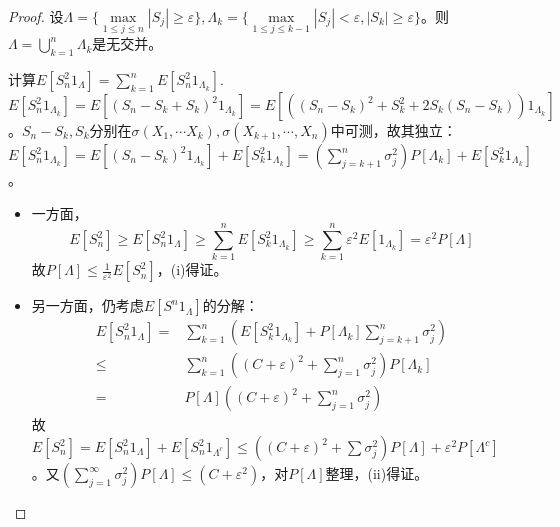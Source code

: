 \documentclass{ctexbook}
\begin{document}
\begin{proof}
  设$\Lambda=\{\max\limits_{1\leq j\leq n}|S_{j}|\geq\varepsilon\},\Lambda_{k}=\{\max\limits_{1\leq j\leq k-1}|S_{j}|<\varepsilon, |S_{k}|\geq \varepsilon\}$。则$\Lambda=\bigcup_{k=1}^{n}\Lambda_{k}$是无交并。

  计算$E[S_{n}^{2}1_{\Lambda}]=\sum_{k=1}^{n}E[S_{n}^{2}1_{\Lambda_{k}}]$. $E[S_{n}^{2}1_{\Lambda_{k}}]=E[(S_{n}-S_{k}+S_{k})^{2}1_{\Lambda_{k}}]=E[((S_{n}-S_{k})^{2}+S_{k}^{2}+2S_{k}(S_{n}-S_{k}))1_{\Lambda_{k}}]$。$S_{n}-S_{k},S_{k}$分别在$\sigma(X_{1},\cdots X_{k}),\sigma(X_{k+1},\cdots,X_{n})$中可测，故其独立：$E[S_{n}^{2}1_{\Lambda_{k}}]=E[(S_{n}-S_{k})^{2}1_{\Lambda_{k}}]+E[S_{k}^{2}1_{\Lambda_{k}}]=(\sum_{j=k+1}^{n}\sigma_{j}^{2})P[\Lambda_{k}]+E[S^{2}_{k}1_{\Lambda_{k}}]$。
  \begin{itemize}
  \item 一方面，\[E[S_{n}^{2}]\geq E[S_{n}^{2}1_{\Lambda}]\geq \sum_{k=1}^{n}E[S_{k}^{2}1_{\Lambda_{k}}]\geq \sum_{k=1}^{n}\varepsilon^{2}E[1_{\Lambda_{k}}]=\varepsilon^{2}P[\Lambda]\]
  故$P[\Lambda]\leq\frac{1}{\varepsilon^{2}}E[S_{n}^{2}]$，(i)得证。
\item 另一方面，仍考虑$E[S^{n}1_{\Lambda}]$的分解：
  \begin{align*}
    E[S_{n}^{2}1_{\Lambda}]=&\sum_{k=1}^{n}(E[S_{k}^{2}1_{\Lambda_{k}}]+P[\Lambda_{k}]\sum_{j=k+1}^{n}\sigma_{j}^{2})\\
    \leq &\sum_{k=1}^{n}((C+\varepsilon)^{2}+\sum_{j=1}^{n}\sigma_{j}^{2})P[\Lambda_{k}]\\
    =&P[\Lambda]((C+\varepsilon)^{2}+\sum_{j=1}^{n}\sigma_{j}^{2})
  \end{align*}
  故$E[S_{n}^{2}]=E[S_{n}^{2}1_{\Lambda}]+E[S_{n}^{2}1_{\Lambda^{c}}]\leq ((C+\varepsilon)^{2}+\sum\sigma_{j}^{2})P[\Lambda]+\varepsilon^{2}P[\Lambda^{c}]$。又$(\sum_{j=1}^{\infty}\sigma_{j}^{2})P[\Lambda]\leq (C+\varepsilon^{2})$，对$P[\Lambda]$整理，(ii)得证。
  \end{itemize}
\end{proof}
\end{document}
